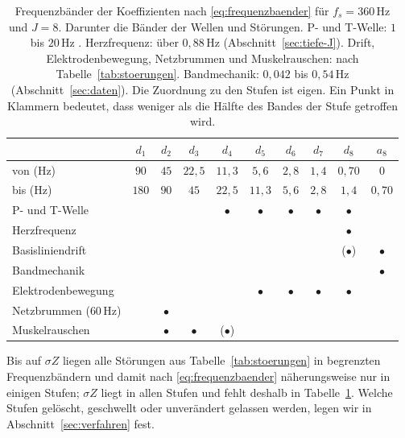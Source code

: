 \documentclass[a4paper,11pt,bibliography=totoc,listof=totoc,headinclude=true,cleardoublepage=empty,oneside]{scrbook}
\theoremstyle{plain}
\theoremstyle{definition}
\begin{document}
\begin{table}[htbp]
  \centering
  \small
  \begin{tabular}{@{}lccccccccc@{}}
    \toprule
     & $d_1$ & $d_2$ & $d_3$ & $d_4$ & $d_5$ & $d_6$ & $d_7$ & $d_8$ & $a_8$ \\
    \midrule
    von (Hz) & $90$ & $45$ & $22{,}5$ & $11{,}3$ & $5{,}6$ & $2{,}8$ & $1{,}4$ & $0{,}70$ & $0$ \\
    bis (Hz) & $180$ & $90$ & $45$ & $22{,}5$ & $11{,}3$ & $5{,}6$ & $2{,}8$ & $1{,}4$ & $0{,}70$ \\
    \midrule
    P- und T-Welle         &   &   &   & $\bullet$ & $\bullet$ & $\bullet$ & $\bullet$ & $\bullet$ &  \\
    Herzfrequenz           &   &   &   &   &   &   &   & $\bullet$ &  \\
    Basisliniendrift       &   &   &   &   &   &   &   & ($\bullet$) & $\bullet$ \\
    Bandmechanik           &   &   &   &   &   &   &   &   & $\bullet$ \\
    Elektrodenbewegung     &   &   &   &   & $\bullet$ & $\bullet$ & $\bullet$ & $\bullet$ &  \\
    Netzbrummen ($60$\,Hz) &   & $\bullet$ &   &   &   &   &   &   &  \\
    Muskelrauschen         &   & $\bullet$ & $\bullet$ & ($\bullet$) &   &   &   &   &  \\
    \bottomrule
  \end{tabular}
  \caption[Frequenzbänder der DWT bei 360 Hz]{Frequenzbänder der
  Koeffizienten nach \eqref{eq:frequenzbaender} für $f_s = 360$\,Hz und
  $J = 8$. Darunter die Bänder der Wellen und Störungen. P- und T-Welle:
  $1$ bis $20$\,Hz \cite[Kap.~2.3.1]{rebstadt}. %
  Herzfrequenz: über $0{,}88$\,Hz (Abschnitt~\ref{sec:tiefe-J}).
  Drift, Elektrodenbewegung, Netzbrummen und Muskelrauschen: nach
  Tabelle~\ref{tab:stoerungen}. Bandmechanik: $0{,}042$ bis $0{,}54$\,Hz
  (Abschnitt~\ref{sec:daten}). Die Zuordnung zu den Stufen ist eigen. Ein
  Punkt in Klammern bedeutet, dass weniger als die Hälfte des Bandes der
  Stufe getroffen wird.}
  \label{tab:baender}
\end{table}

Bis auf $\sigma Z$ liegen alle Störungen aus Tabelle~\ref{tab:stoerungen} in
begrenzten Frequenzbändern und damit nach \eqref{eq:frequenzbaender}
näherungsweise nur in einigen Stufen; $\sigma Z$ liegt in allen Stufen und
fehlt deshalb in Tabelle~\ref{tab:baender}. Welche Stufen gelöscht,
geschwellt oder unverändert gelassen werden, legen wir in
Abschnitt~\ref{sec:verfahren} fest.
\end{document}

